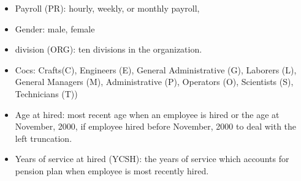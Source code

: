 \documentclass[12pt,letterpaper]{article}
\begin{document}
\begin{itemize}
	\item Payroll (PR): hourly, weekly, or monthly payroll,
	\item Gender: male, female
	\item division (ORG): ten divisions in the organization.
	\item Cocs: Crafts(C), Engineers (E), General Administrative (G), Laborers (L), General Managers (M),  Administrative (P),  Operators (O), Scientists (S), Technicians (T))
	\item Age at hired: most recent age when an employee is hired or the age at November, 2000, if employee hired before November, 2000 to deal with the left truncation.
	\item Years of service at hired (YCSH): the years of service which accounts for pension plan when employee is most recently hired.
	
\end{itemize}
\end{document}

